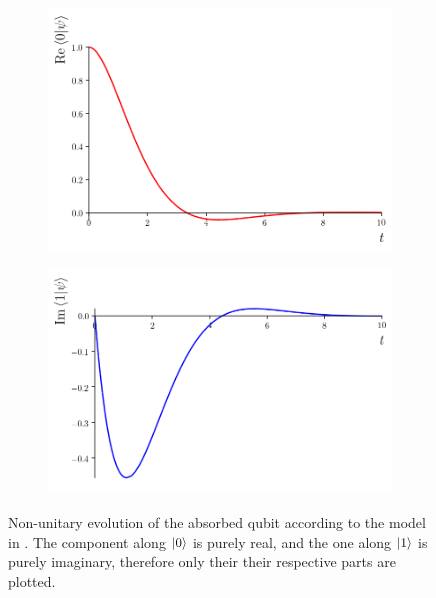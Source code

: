 \begin{figure} %
  \centering
  \begin{subfigure}{0.49\textwidth}
    \includegraphics[width=\linewidth]{img/2ldetect/re_psi0_t.png}
    \subcaption{}\label{fig:absorbed-qubit-components:re0}
  \end{subfigure}
  \begin{subfigure}{0.49\textwidth}
    \includegraphics[width=\linewidth]{img/2ldetect/im_psi1_t.png}
    \subcaption{}\label{fig:absorbed-qubit-components:im1}
  \end{subfigure}
  \caption[
    Non-unitary evolution of absorbed qubit
  ]{
    Non-unitary evolution of the absorbed qubit
    according to the model in
    \cite{RuschhauptAbsorption}.
    The component along $\ket{0}$ is purely real,
    and the one along $\ket{1}$ is purely imaginary,
    therefore only their their respective parts are plotted.
  }\label{fig:absorbed-qubit-components}
\end{figure}

